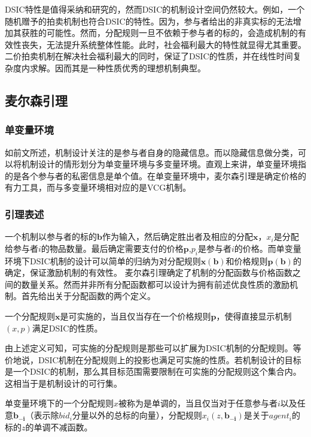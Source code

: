 \documentclass[promaster]{thesis-uestc}
\begin{document}
DSIC特性是值得采纳和研究的，然而DSIC的机制设计空间仍然较大。例如，一个随机赠予的拍卖机制也符合DSIC的特性。因为，参与者给出的非真实标的无法增加其获胜的可能性。然而，分配规则一旦不依赖于参与者的标的，会造成机制的有效性丧失，无法提升系统整体性能。此时，社会福利最大的特性就显得尤其重要。二价拍卖机制在解决社会福利最大的同时，保证了DSIC的性质，并在线性时间复杂度内求解。因而其是一种性质优秀的理想机制典型。

\subsection{麦尔森引理}

\subsubsection{单变量环境}

如前文所述，机制设计关注的是参与者自身的隐藏信息。而以隐藏信息做分类，可以将机制设计的情形划分为单变量环境与多变量环境。直观上来讲，单变量环境指的是各个参与者的私密信息是单个值。在单变量环境中，麦尔森引理是确定价格的有力工具，而与多变量环境相对应的是VCG机制。

\subsubsection{引理表述}

一个机制以参与者的标的$\mathbf{b}$作为输入，然后确定胜出者及相应的分配$\mathbf{x}$，$x_i$是分配给参与者$i$的物品数量。最后确定需要支付的价格$\mathbf{p}$,$p_i$是参与者$i$的价格。而单变量环境下DSIC机制的设计可以简单的归纳为对分配规则$\mathbf{x(b)}$和价格规则$\mathbf{p(b)}$的确定，保证激励机制的有效性。
麦尔森引理确定了机制的分配函数与价格函数之间的数量关系。然而并非所有分配函数都可以设计为拥有前述优良性质的激励机制。首先给出关于分配函数的两个定义。

\begin{definition}[可实施的分配规则]
一个分配规则$\mathbf{x}$是可实施的，当且仅当存在一个价格规则$\mathbf{p}$，使得直接显示机制$(x,p)$满足DSIC的性质。
\end{definition}

由上述定义可知，可实施的分配规则是那些可以扩展为DSIC机制的分配规则。等价地说，DSIC机制在分配规则上的投影也满足可实施的性质。若机制设计的目标是一个DSIC的机制，那么其目标范围需要限制在可实施的分配规则这个集合内。这相当于是机制设计的可行集。

\begin{definition}[单调分配规则]
    单变量环境下的一个分配规则$x$被称为是单调的，当且仅当对于任意参与者$i$以及任意$\mathbf{b_{-i}}$（表示除$bid_i$分量以外的总标的向量），分配规则$x_i(z,\mathbf{b_{-i}})$是关于$agent_i$的标的$z$的单调不减函数。
\end{definition}
\end{document}
